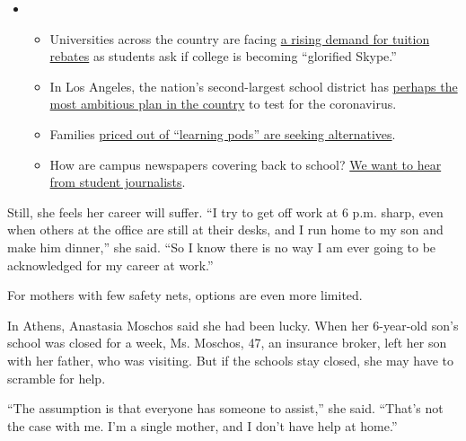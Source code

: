 \begin{itemize}
\item
  \begin{itemize}
  \tightlist
  \item
    Universities across the country are facing
    \href{https://www.nytimes.com/2020/08/15/us/covid-college-tuition.html?action=click\&pgtype=Article\&state=default\&region=MAIN_CONTENT_3\&context=storylines_keepup}{a
    rising demand for tuition rebates} as students ask if college is
    becoming ``glorified Skype.''
  \item
    In Los Angeles, the nation's second-largest school district has
    \href{https://www.nytimes.com/2020/08/16/us/los-angeles-schools-virus-testing.html?action=click\&pgtype=Article\&state=default\&region=MAIN_CONTENT_3\&context=storylines_keepup}{perhaps
    the most ambitious plan in the country} to test for the coronavirus.
  \item
    Families
    \href{https://www.nytimes.com/2020/08/14/us/covid-schools-learning-pods.html?action=click\&pgtype=Article\&state=default\&region=MAIN_CONTENT_3\&context=storylines_keepup}{priced
    out of ``learning pods'' are seeking alternatives}.
  \item
    How are campus newspapers covering back to school?
    \href{https://www.nytimes.com/2020/08/17/us/student-newspaper-schools-reopening.html?action=click\&pgtype=Article\&state=default\&region=MAIN_CONTENT_3\&context=storylines_keepup}{We
    want to hear from student journalists}.
  \end{itemize}
\end{itemize}

Still, she feels her career will suffer. ``I try to get off work at 6
p.m. sharp, even when others at the office are still at their desks, and
I run home to my son and make him dinner,'' she said. ``So I know there
is no way I am ever going to be acknowledged for my career at work.''

For mothers with few safety nets, options are even more limited.

In Athens, Anastasia Moschos said she had been lucky. When her
6-year-old son's school was closed for a week, Ms. Moschos, 47, an
insurance broker, left her son with her father, who was visiting. But if
the schools stay closed, she may have to scramble for help.

``The assumption is that everyone has someone to assist,'' she said.
``That's not the case with me. I'm a single mother, and I don't have
help at home.''

